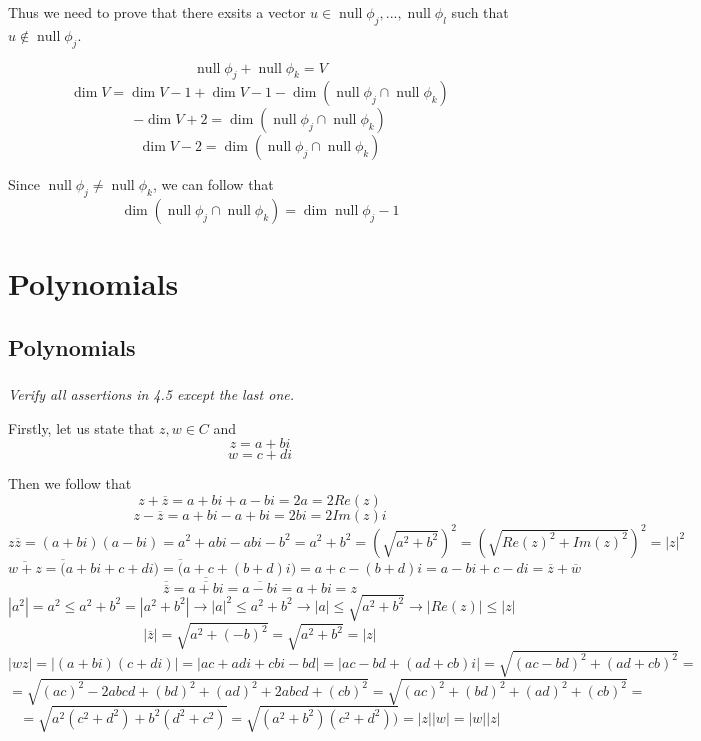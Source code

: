 \documentclass[11pt,oneside,titlepage]{book}
\DeclareMathOperator \ns {null}
\begin{document}
Thus we need to prove that there exsits a vector $u \in \ns  \phi_j, ..., \ns \phi_l$
such that $u \notin \ns \phi_j$. 

$$\ns \phi_j + \ns \phi_k = V$$
$$\dim V = \dim V - 1 + \dim V - 1 - \dim (\ns \phi_j \cap \ns \phi_k)$$
$$- \dim V + 2 = \dim (\ns \phi_j \cap \ns \phi_k)$$
$$\dim V - 2 = \dim (\ns \phi_j \cap \ns \phi_k)$$

Since $\ns \phi_j \neq \ns \phi_k$, we can follow that
$$\dim (\ns \phi_j \cap \ns \phi_k) = \dim \ns \phi_j -  1$$


\chapter{Polynomials}

\section{Polynomials}


\subsection{}

\textit{Verify all assertions in 4.5 except the last one.}

Firstly, let us state that $z, w \in C$ and
$$z = a + bi$$
$$w = c + di$$

Then we follow that 
$$z + \overline{z} = a + bi + a - bi = 2a = 2 Re(z)$$
$$z - \overline{z} = a + bi - a + bi = 2bi = 2 Im(z) i$$
$$z \overline{z} = (a + bi) (a - bi) = a^2 + abi - abi - b^2 = a^2 + b^2 =
(\sqrt{a^2 + b^2})^2 = (\sqrt{Re(z)^2 + Im(z)^2})^2 = |z|^2$$
$$\overline{w + z} = \overline(a + bi + c + di) =
\overline(a + c + (b + d)i) = a + c - (b + d)i = a - bi + c - di = \overline{z} + \overline{w}$$
$$\overline{\overline{z}} = \overline{\overline{a + bi}}  =
\overline{a - bi} = a + bi = z$$
$$|a^2|  = a^2 \leq a^2 + b^2 = |a^2 + b^2| \to |a|^2 \leq a^2 + b^2 \to |a| \leq \sqrt{a^2 + b^2}
\to  |Re(z)| \leq |z| $$
$$|\overline{z}| = \sqrt{a^2 + (-b)^2} = \sqrt{a^2 + b^2} = |z|$$
$$|wz| = |(a + bi) (c + di)| = |ac + adi + cbi - bd| = |ac - bd +  (ad + cb)i| =
\sqrt{(ac - bd)^2 + (ad + cb)^2} = $$
$$ = \sqrt{(ac)^2 - 2abcd + (bd)^2 + (ad)^2 + 2abcd  + (cb)^2} =
\sqrt{(ac)^2  + (bd)^2 + (ad)^2  + (cb)^2} = $$
$$ = \sqrt{a^2(c^2 + d^2)  + b^2(d^2 + c^2)}  = \sqrt{(a^2 + b^2)(c^2 + d^2))}  = |z||w| = |w||z|$$

\subsection{}
\end{document}
